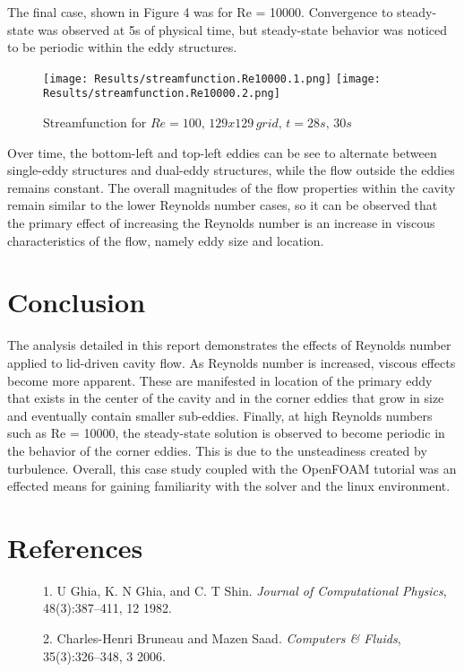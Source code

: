 \documentclass[twocolumn,10pt]{asme2ej}
\begin{document}
The final case, shown in Figure 4 was for Re = 10000.  Convergence to steady-state was observed at 5s of physical time, but steady-state behavior was noticed to be periodic within the eddy structures.
\clearpage

\vspace{-2em}
\begin{figure}[htb]
\begin{center}
\texttt{[image: Results/streamfunction.Re10000.1.png]}
\texttt{[image: Results/streamfunction.Re10000.2.png]}
\caption{Streamfunction for $Re = 100,\, 129x129\, grid ,\, t = 28s, \,30s$}
\end{center}
\end{figure}
\vspace{-2em}

Over time, the bottom-left and top-left eddies can be see to alternate between single-eddy structures and dual-eddy structures, while the flow outside the eddies remains constant.  The overall magnitudes of the flow properties within the cavity remain similar to the lower Reynolds number cases, so it can be observed that the primary effect of increasing the Reynolds number is an increase in viscous characteristics of the flow, namely eddy size and location.

\section{Conclusion}
The analysis detailed in this report demonstrates the effects of Reynolds number applied to lid-driven cavity flow. As Reynolds number is increased, viscous effects become more apparent.  These are manifested in location of the primary eddy that exists in the center of the cavity and in the corner eddies that grow in size and eventually contain smaller sub-eddies.  Finally, at high Reynolds numbers such as Re = 10000, the steady-state solution is observed to become periodic in the behavior of the corner eddies.  This is due to the unsteadiness created by turbulence.  Overall, this case study coupled with the OpenFOAM tutorial was an effected means for gaining familiarity with the solver and the linux environment.

\section{References}
\begin{description}
\item[] 1. U Ghia, K. N Ghia, and C. T Shin. \emph{Journal of Computational Physics}, 48(3):387–411, 12 1982.
\item[] 2. Charles-Henri Bruneau and Mazen Saad. \emph{Computers \& Fluids}, 35(3):326–348, 3 2006.
\end{description}
\end{document}
